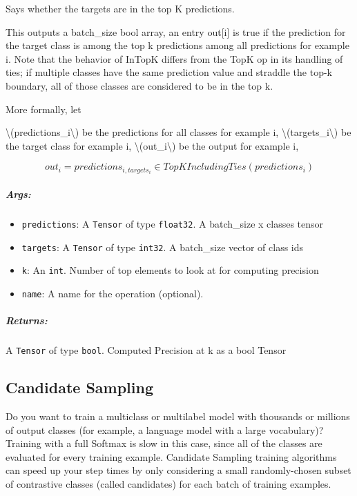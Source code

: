 Says whether the targets are in the top K predictions.

This outputs a batch\_size bool array, an entry out{[}i{]} is true if
the prediction for the target class is among the top k predictions among
all predictions for example i. Note that the behavior of InTopK differs
from the TopK op in its handling of ties; if multiple classes have the
same prediction value and straddle the top-k boundary, all of those
classes are considered to be in the top k.

More formally, let

\textbackslash{}(predictions\_i\textbackslash{}) be the predictions for
all classes for example i, \textbackslash{}(targets\_i\textbackslash{})
be the target class for example i,
\textbackslash{}(out\_i\textbackslash{}) be the output for example i,

\[out_i = predictions_{i, targets_i} \in TopKIncludingTies(predictions_i)\]

\subparagraph{Args: }\label{args-22}

\begin{itemize}
\tightlist
\item
  \texttt{predictions}: A \texttt{Tensor} of type \texttt{float32}. A
  batch\_size x classes tensor
\item
  \texttt{targets}: A \texttt{Tensor} of type \texttt{int32}. A
  batch\_size vector of class ids
\item
  \texttt{k}: An \texttt{int}. Number of top elements to look at for
  computing precision
\item
  \texttt{name}: A name for the operation (optional).
\end{itemize}

\subparagraph{Returns: }\label{returns-22}

A \texttt{Tensor} of type \texttt{bool}. Computed Precision at k as a
bool Tensor

\subsection{Candidate Sampling }\label{candidate-sampling}

Do you want to train a multiclass or multilabel model with thousands or
millions of output classes (for example, a language model with a large
vocabulary)? Training with a full Softmax is slow in this case, since
all of the classes are evaluated for every training example. Candidate
Sampling training algorithms can speed up your step times by only
considering a small randomly-chosen subset of contrastive classes
(called candidates) for each batch of training examples.

